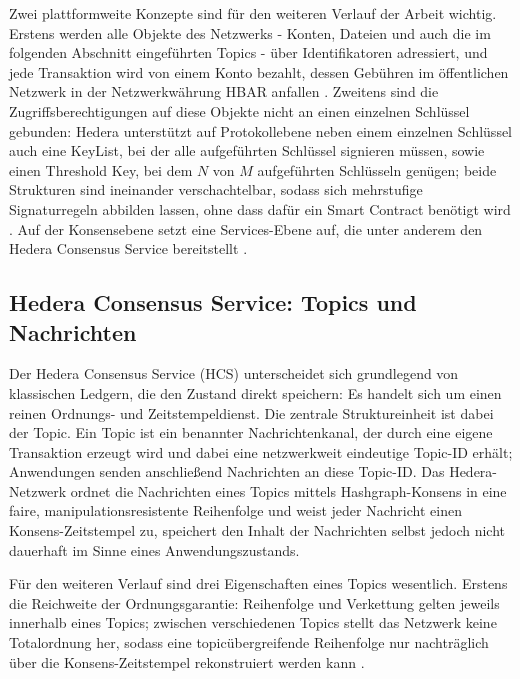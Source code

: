 Zwei plattformweite Konzepte sind für den weiteren Verlauf der Arbeit wichtig. Erstens werden alle Objekte des Netzwerks - Konten, Dateien und auch die im folgenden Abschnitt eingeführten Topics - über Identifikatoren adressiert, und jede Transaktion wird von einem Konto bezahlt, dessen Gebühren im öffentlichen Netzwerk in der Netzwerkwährung HBAR anfallen \cite{bairdharmon2019}. Zweitens sind die Zugriffsberechtigungen auf diese Objekte nicht an einen einzelnen Schlüssel gebunden: Hedera unterstützt auf Protokollebene neben einem einzelnen Schlüssel auch eine KeyList, bei der alle aufgeführten Schlüssel signieren müssen, sowie einen Threshold Key, bei dem $N$ von $M$ aufgeführten Schlüsseln genügen; beide Strukturen sind ineinander verschachtelbar, sodass sich mehrstufige Signaturregeln abbilden lassen, ohne dass dafür ein Smart Contract benötigt wird \cite{hederakeys}. Auf der Konsensebene setzt eine Services-Ebene auf, die unter anderem den Hedera Consensus Service bereitstellt \cite{bairdgross2019}.

\subsection{Hedera Consensus Service: Topics und Nachrichten}
\label{subsec:grundlagen-hcs-topics}
Der Hedera Consensus Service (HCS) unterscheidet sich grundlegend von klassischen Ledgern, die den Zustand direkt speichern: Es handelt sich um einen reinen Ordnungs- und Zeitstempeldienst. Die zentrale Struktureinheit ist dabei der Topic. Ein Topic ist ein benannter Nachrichtenkanal, der durch eine eigene Transaktion erzeugt wird und dabei eine netzwerkweit eindeutige Topic-ID erhält; Anwendungen senden anschließend Nachrichten an diese Topic-ID. Das Hedera-Netzwerk ordnet die Nachrichten eines Topics mittels Hashgraph-Konsens in eine faire, manipulationsresistente Reihenfolge und weist jeder Nachricht einen Konsens-Zeitstempel zu, speichert den Inhalt der Nachrichten selbst jedoch nicht dauerhaft im Sinne eines Anwendungszustands. \cite{bairdgross2019}

Für den weiteren Verlauf sind drei Eigenschaften eines Topics wesentlich. Erstens die Reichweite der Ordnungsgarantie: Reihenfolge und Verkettung gelten jeweils innerhalb eines Topics; zwischen verschiedenen Topics stellt das Netzwerk keine Totalordnung her, sodass eine topicübergreifende Reihenfolge nur nachträglich über die Konsens-Zeitstempel rekonstruiert werden kann \cite{bairdgross2019}.

